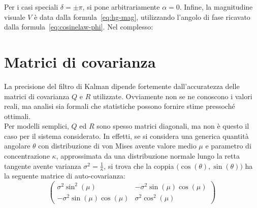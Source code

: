 \documentclass[12pt,a4paper,openright,twoside]{book}
\begin{document}
Per i casi speciali $\delta=\pm\pi$, si pone arbitrariamente $\alpha=0$. Infine, la magnitudine visuale $V$ è data dalla formula~\ref{eq:hg-mag}, utilizzando l'angolo di fase ricavato dalla formula~\ref{eq:cosinelaw-phi}. Nel complesso:



\section{Matrici di covarianza}\label{sec:real-system-covs}

La precisione del filtro di Kalman dipende fortemente dall'accuratezza delle matrici di covarianza $Q$ e $R$ utilizzate. Ovviamente non se ne conoscono i valori reali, ma analisi sia formali che statistiche possono fornire stime pressoché ottimali. \\
Per modelli semplici, $Q$ ed $R$ sono spesso matrici diagonali, ma non è questo il caso per il sistema considerato. In effetti, se si considera una generica quantità angolare $\theta$ con distribuzione di von Mises avente valore medio $\mu$ e parametro di concentrazione $\kappa$, approssimata da una distribuzione normale lungo la retta tangente avente varianza $\sigma^2=\frac{1}{\kappa}$, si trova che la coppia $\bigl(\cos(\theta),\sin(\theta)\bigr)$ ha la seguente matrice di auto-covarianza:
\begin{equation}
\begin{pmatrix}
\sigma^2\sin^2(\mu) & -\sigma^2\sin(\mu)\cos(\mu) \\
-\sigma^2\sin(\mu)\cos(\mu) & \sigma^2\cos^2(\mu)
\end{pmatrix}
\end{equation}
\end{document}
